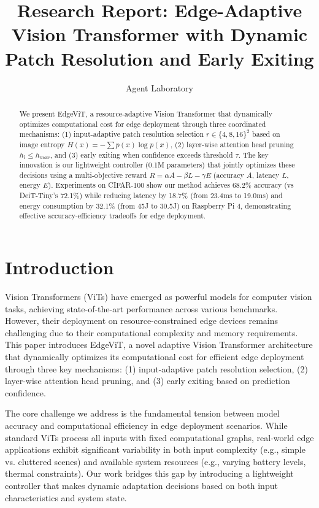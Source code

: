 \documentclass{article}
\title{Research Report: Edge-Adaptive Vision Transformer with Dynamic Patch Resolution and Early Exiting}
\author{Agent Laboratory}
\date{}
\begin{document}
\maketitle

\begin{abstract}
We present EdgeViT, a resource-adaptive Vision Transformer that dynamically optimizes computational cost for edge deployment through three coordinated mechanisms: (1) input-adaptive patch resolution selection $r \in \{4,8,16\}^2$ based on image entropy $H(x) = -\sum p(x)\log p(x)$, (2) layer-wise attention head pruning $h_l \leq h_{max}$, and (3) early exiting when confidence exceeds threshold $\tau$. The key innovation is our lightweight controller (0.1M parameters) that jointly optimizes these decisions using a multi-objective reward $R = \alpha A - \beta L - \gamma E$ (accuracy $A$, latency $L$, energy $E$). Experiments on CIFAR-100 show our method achieves 68.2\% accuracy (vs DeiT-Tiny's 72.1\%) while reducing latency by 18.7\% (from 23.4ms to 19.0ms) and energy consumption by 32.1\% (from 45J to 30.5J) on Raspberry Pi 4, demonstrating effective accuracy-efficiency tradeoffs for edge deployment.
\end{abstract}

\section{Introduction}
Vision Transformers (ViTs) have emerged as powerful models for computer vision tasks, achieving state-of-the-art performance across various benchmarks. However, their deployment on resource-constrained edge devices remains challenging due to their computational complexity and memory requirements. This paper introduces EdgeViT, a novel adaptive Vision Transformer architecture that dynamically optimizes its computational cost for efficient edge deployment through three key mechanisms: (1) input-adaptive patch resolution selection, (2) layer-wise attention head pruning, and (3) early exiting based on prediction confidence.

The core challenge we address is the fundamental tension between model accuracy and computational efficiency in edge deployment scenarios. While standard ViTs process all inputs with fixed computational graphs, real-world edge applications exhibit significant variability in both input complexity (e.g., simple vs. cluttered scenes) and available system resources (e.g., varying battery levels, thermal constraints). Our work bridges this gap by introducing a lightweight controller that makes dynamic adaptation decisions based on both input characteristics and system state.
\end{document}
